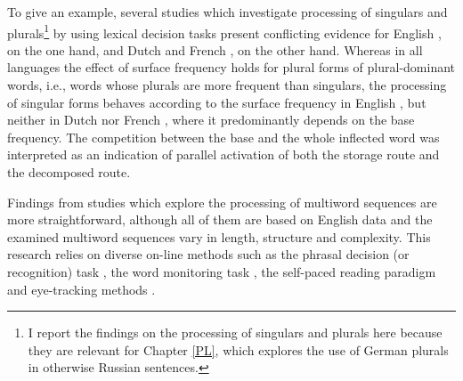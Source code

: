 To give an example, several studies which investigate processing of singulars and plurals\footnote{I report the findings on the processing of singulars and plurals here because they are relevant for Chapter \ref{PL}, which explores the use of German plurals in otherwise Russian sentences.} by using lexical decision tasks present conflicting evidence for English \citep{sereno-jongman-1997,new-etal-2004}, on the one hand, and Dutch \citep{baayen-dijkstra-schreuder} and French \citep{new-etal-2004}, on the other hand. Whereas in all languages the effect of surface frequency holds for plural forms of plural-dominant words, i.e., words whose plurals are more frequent than singulars, the processing of singular forms behaves according to the surface frequency in English \citep{sereno-jongman-1997,new-etal-2004}, but neither in Dutch \citep{baayen-dijkstra-schreuder} nor French \citep{new-etal-2004}, where it predominantly depends on the base frequency. The competition between the base and the whole inflected word was interpreted as an indication of parallel activation of both the storage route and the decomposed route.

Findings from studies which explore the processing of multiword sequences are more straightforward, although all of them are based on English data and the examined multiword sequences vary in length, structure and complexity. This research relies on diverse on-line methods such as the phrasal decision (or recognition) task \citep{bod2000,arnon-snider}, the word monitoring task \citep{sosa-macfarlane,kapatsinski-radicke}, the self-paced reading paradigm \citep{macdonald,reali-christiansen,bannard-ramscar,tremblay-etal2009,tremblay-etal11} and eye-tracking methods \citep{mcdonald-shillcock,siyanova-etal}.

